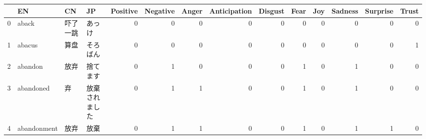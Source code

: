 \begin{tabular}{llllrrrrrrrrrr}
\toprule
 & EN & CN & JP & Positive & Negative & Anger & Anticipation & Disgust & Fear & Joy & Sadness & Surprise & Trust \\
\midrule
0 & aback & 吓了一跳 & あっけ & 0 & 0 & 0 & 0 & 0 & 0 & 0 & 0 & 0 & 0 \\
1 & abacus & 算盘 & そろばん & 0 & 0 & 0 & 0 & 0 & 0 & 0 & 0 & 0 & 1 \\
2 & abandon & 放弃 & 捨てます & 0 & 1 & 0 & 0 & 0 & 1 & 0 & 1 & 0 & 0 \\
3 & abandoned & 弃 & 放棄されました & 0 & 1 & 1 & 0 & 0 & 1 & 0 & 1 & 0 & 0 \\
4 & abandonment & 放弃 & 放棄 & 0 & 1 & 1 & 0 & 0 & 1 & 0 & 1 & 1 & 0 \\
\bottomrule
\end{tabular}
